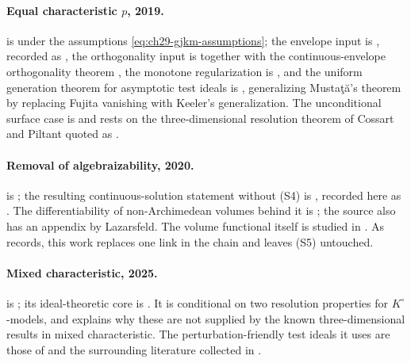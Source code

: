 \paragraph{Equal characteristic $p$, 2019.}
 is
\cite[Theorem~1.5 and Theorem~9.3]{GJKM19} under the assumptions
\eqref{eq:ch29-gjkm-assumptions}; the envelope input is
\cite[Theorem~1.4 and Theorem~8.2]{GJKM19}, recorded as
, the orthogonality input is
\cite[Theorem~9.2]{GJKM19} together with the continuous-envelope orthogonality theorem
\cite[Theorem~6.3.2]{BGGJKM20}, the monotone regularization is
\cite[Corollary~9.1]{GJKM19}, and the uniform generation theorem for
asymptotic test ideals is
\cite[Theorem~1.3 and Theorem~4.6]{GJKM19}, generalizing
Mustaţă's theorem \cite{MustataTest} by replacing Fujita vanishing with
Keeler's generalization.  The unconditional surface case
 is \cite[Corollary~8.3]{GJKM19} and rests
on the three-dimensional resolution theorem of Cossart and Piltant quoted
as \cite[Theorem~6.3]{GJKM19}.

\paragraph{Removal of algebraizability, 2020.}
 is
\cite[Theorem~6.3.3 and Corollary~6.3.4]{BGGJKM20}; the resulting
continuous-solution statement without \textup{(S4)} is
\cite[Theorem~D]{BGGJKM20}, recorded here as
.  The differentiability of non-Archimedean volumes
behind it is \cite[Theorem~5.4.3]{BGGJKM20}; the source also has
an appendix by Lazarsfeld.  The volume functional itself is studied in \cite{BGM21}.  As
 records, this work replaces one link in
the chain and leaves \textup{(S5)} untouched.

\paragraph{Mixed characteristic, 2025.}
 is \cite[Theorems~7.1 and~8.1]{FGK25};
its ideal-theoretic core is \cite[Theorem~5.1]{FGK25}.  It is conditional on
two resolution properties for $K^\circ$-models, and
 explains why these are not supplied by the
known three-dimensional results in mixed characteristic.  The
perturbation-friendly test ideals it uses are those of
\cite{RobertsSingh} and the surrounding literature collected in
.

